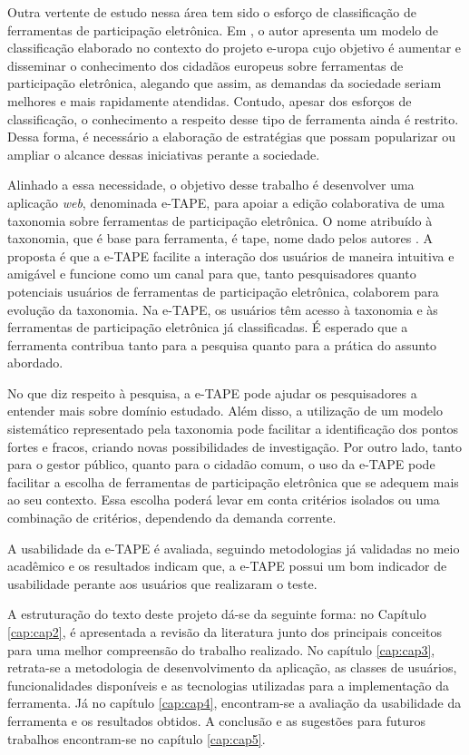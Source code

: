 \par
Outra vertente de estudo nessa área tem sido o esforço de classificação de ferramentas de participação eletrônica. Em  , o autor apresenta um modelo 
de classificação elaborado no contexto do projeto \acrfull{e-uropa} cujo objetivo é aumentar e disseminar o conhecimento dos cidadãos europeus sobre ferramentas de participação 
eletrônica, alegando que assim, as demandas da sociedade seriam melhores e mais rapidamente atendidas. Contudo, apesar dos esforços de classificação, o conhecimento a respeito desse 
tipo de ferramenta ainda é restrito. Dessa forma, é necessário a elaboração de estratégias que possam popularizar ou ampliar o alcance dessas iniciativas perante a sociedade.

\par
Alinhado a essa necessidade, o objetivo desse trabalho é desenvolver uma aplicação \textit{web}, denominada e-TAPE, para apoiar a edição colaborativa de uma taxonomia sobre 
ferramentas de participação eletrônica. O nome atribuído à taxonomia, que é base para ferramenta, é \acrfull{tape}, nome dado pelos autores . 
A proposta é que a e-TAPE facilite a interação dos usuários de maneira intuitiva e amigável e funcione como um canal para que, tanto pesquisadores quanto potenciais usuários de
ferramentas de participação eletrônica, colaborem para evolução da taxonomia. Na e-TAPE, os usuários têm acesso à taxonomia e às ferramentas de participação eletrônica já classificadas.
É esperado que a ferramenta contribua tanto para a pesquisa quanto para a prática do assunto abordado. 

\par
No que diz respeito à pesquisa, a e-TAPE pode ajudar os pesquisadores a entender mais sobre domínio estudado. Além disso, a utilização de um modelo sistemático representado pela taxonomia 
pode facilitar a identificação dos pontos fortes e fracos, criando novas possibilidades de investigação. Por outro lado, tanto para o gestor público, quanto para o cidadão comum, 
o uso da e-TAPE pode facilitar a escolha de ferramentas de participação eletrônica que se adequem mais ao seu contexto. Essa escolha poderá levar em conta critérios 
isolados ou uma combinação de critérios, dependendo da demanda corrente. 

\par
A usabilidade da e-TAPE é avaliada, seguindo metodologias já validadas no meio acadêmico e os resultados indicam que, a e-TAPE possui um bom indicador de usabilidade perante aos 
usuários que realizaram o teste. 

\par
A estruturação do texto deste projeto dá-se da seguinte forma: no Capítulo \ref{cap:cap2}, é apresentada a revisão da literatura junto dos principais conceitos para uma melhor 
compreensão do trabalho realizado. No capítulo \ref{cap:cap3}, retrata-se a metodologia de desenvolvimento da aplicação, as classes de usuários, funcionalidades disponíveis e
as tecnologias utilizadas para a implementação da ferramenta. Já no capítulo \ref{cap:cap4}, encontram-se a avaliação da usabilidade da ferramenta e os resultados obtidos. 
A conclusão e as sugestões para futuros trabalhos encontram-se no capítulo \ref{cap:cap5}.
